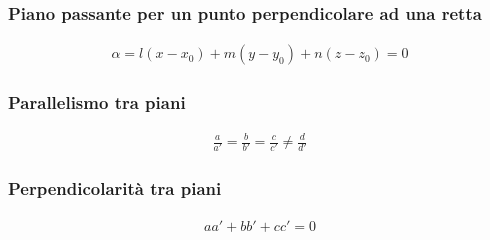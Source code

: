 \documentclass[a4paper]{article}
\begin{document}
	\subsubsection{Piano passante per un punto perpendicolare ad una retta}
	
	\begin{align*}
		\alpha = l(x-x_0)+m(y-y_0)+n(z-z_0)=0
	\end{align*}
	
	\subsubsection{Parallelismo tra piani}
	\begin{align*}
		\frac{a}{a'} = \frac{b}{b'} = \frac{c}{c'} \ne \frac{d}{d'}
	\end{align*}
	
	\subsubsection{Perpendicolarità tra piani}
	\begin{align*}
		aa'+bb'+cc'=0
	\end{align*}
	
	\newpage
\end{document}
